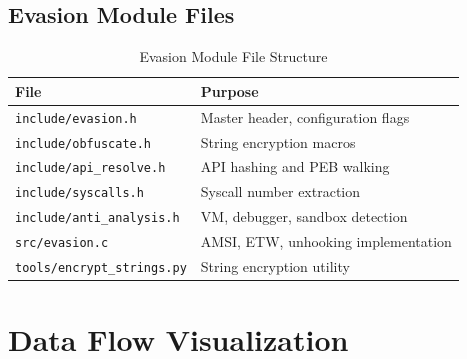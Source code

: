 \documentclass[12pt,a4paper]{article}
\begin{document}
\subsection{Evasion Module Files}

\begin{table}[H]
\centering
\begin{tabular}{ll}
\toprule
\textbf{File} & \textbf{Purpose} \\
\midrule
\texttt{include/evasion.h} & Master header, configuration flags \\
\texttt{include/obfuscate.h} & String encryption macros \\
\texttt{include/api\_resolve.h} & API hashing and PEB walking \\
\texttt{include/syscalls.h} & Syscall number extraction \\
\texttt{include/anti\_analysis.h} & VM, debugger, sandbox detection \\
\texttt{src/evasion.c} & AMSI, ETW, unhooking implementation \\
\texttt{tools/encrypt\_strings.py} & String encryption utility \\
\bottomrule
\end{tabular}
\caption{Evasion Module File Structure}
\end{table}

\section{Data Flow Visualization}
\end{document}
